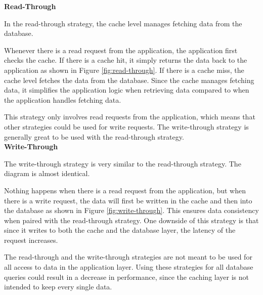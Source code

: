 \noindent \textbf{Read-Through}

In the read-through strategy, the cache level manages fetching data from the database.


\readThroughFigure

\noindent Whenever there is a read request from the application, the application first checks the cache.
If there is a cache hit, it simply returns the data back to the application as shown in Figure \ref{fig:read-through}. If there is a cache miss, the cache level fetches the data from the database.
Since the cache manages fetching data, it simplifies the application logic when retrieving data compared to when the application handles fetching data.

This strategy only involves read requests from the application, which means that other strategies could be used for write requests.
The write-through strategy is generally great to be used with the read-through strategy.\\

\noindent \textbf{Write-Through}

The write-through strategy is very similar to the read-through strategy. The diagram is almost identical.

\writeThroughFigure

\noindent Nothing happens when there is a read request from the application, but when there is a write request,
the data will first be written in the cache and then into the database as shown in Figure \ref{fig:write-through}.
This ensures data consistency when paired with the read-through strategy.
One downside of this strategy is that since it writes to both the cache and the database layer, the latency of the request increases.

The read-through and the write-through strategies are not meant to be used for all access to data in the application layer.
Using these strategies for all database queries could result in a decrease in performance, since the caching layer is not intended to keep every single data.\\

